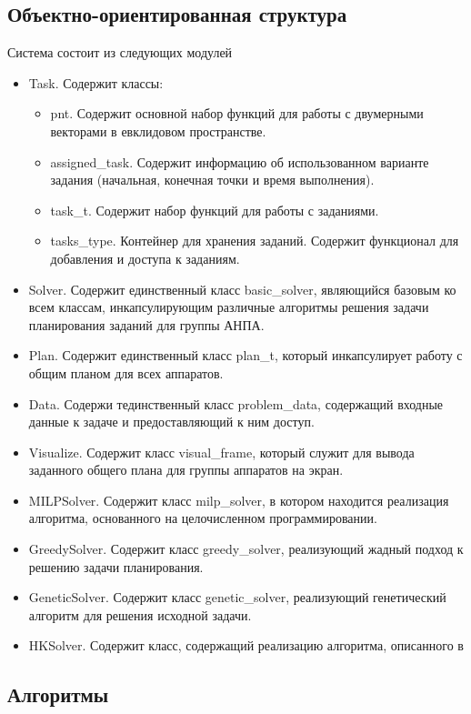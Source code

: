 \documentclass[a4paper,14pt,russian]{article}
\begin{document}
\subsection{Объектно-ориентированная структура}
Система состоит из следующих модулей
\begin{itemize}
\item Task. Содержит классы:
    \begin{itemize}
    \item pnt. Содержит основной набор функций для работы с двумерными векторами в евклидовом пространстве. %
    \item assigned\_task. Содержит информацию об использованном варианте задания (начальная, конечная точки и время выполнения). %
    \item task\_t. Содержит набор функций для работы с заданиями.
    \item tasks\_type. Контейнер для хранения заданий. Содержит функционал для добавления и доступа к заданиям.
    \end{itemize}
\item Solver. Содержит единственный класс basic\_solver, являющийся базовым ко всем классам, инкапсулирующим различные алгоритмы решения задачи планирования заданий для группы АНПА.
\item Plan. Содержит единственный класс plan\_t, который инкапсулирует работу с общим планом для всех аппаратов.
\item Data. Содержи тединственный класс problem\_data, содержащий входные данные к задаче и предоставляющий к ним доступ.
\item Visualize. Содержит класс visual\_frame, который служит для вывода заданного общего плана для группы аппаратов на экран.
\item MILPSolver. Содержит класс milp\_solver, в котором находится реализация алгоритма, основанного на целочисленном программировании.
\item GreedySolver. Содержит класс greedy\_solver, реализующий жадный подход к решению задачи планирования.
\item GeneticSolver. Содержит класс genetic\_solver, реализующий генетический алгоритм для решения исходной задачи.
\item HKSolver. Содержит класс, содержащий реализацию алгоритма, описанного в \cite{tuphanov}
\end{itemize}

\subsection{Алгоритмы}
\end{document}
